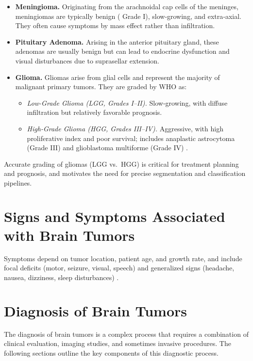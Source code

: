 \begin{itemize}
  \item \textbf{Meningioma.}
        Originating from the arachnoidal cap cells of the meninges, meningiomas are typically benign ( Grade I), slow‐growing, and extra‐axial. They often cause symptoms by mass effect rather than infiltration.

  \item \textbf{Pituitary Adenoma.}
        Arising in the anterior pituitary gland, these adenomas are usually benign but can lead to endocrine dysfunction and visual disturbances due to suprasellar extension.

  \item \textbf{Glioma.}
        Gliomas arise from glial cells and represent the majority of malignant primary  tumors. They are graded by WHO as:
        \begin{itemize}
          \item \emph{Low-Grade Glioma (LGG, Grades I–II).} Slow‐growing, with diffuse infiltration but relatively favorable prognosis.
          \item \emph{High-Grade Glioma (HGG, Grades III–IV).} Aggressive, with high proliferative index and poor survival; includes anaplastic astrocytoma (Grade III) and glioblastoma multiforme (Grade IV) \cite{naser2020lgmi}.
        \end{itemize}
\end{itemize}

Accurate grading of gliomas (LGG vs.\ HGG) is critical for treatment planning and prognosis, and motivates the need for precise segmentation and classification pipelines.


\section{Signs and Symptoms Associated with Brain Tumors}
Symptoms depend on tumor location, patient age, and growth rate, and include focal deficits (motor, seizure, visual, speech) and generalized signs (headache, nausea, dizziness, sleep disturbances) \cite{ref9}.

\section{Diagnosis of Brain Tumors}
\label{sec:diagnosis-brain-tumors}
The diagnosis of brain tumors is a complex process that requires a combination of clinical evaluation, imaging studies, and sometimes invasive procedures. The following sections outline the key components of this diagnostic process.
